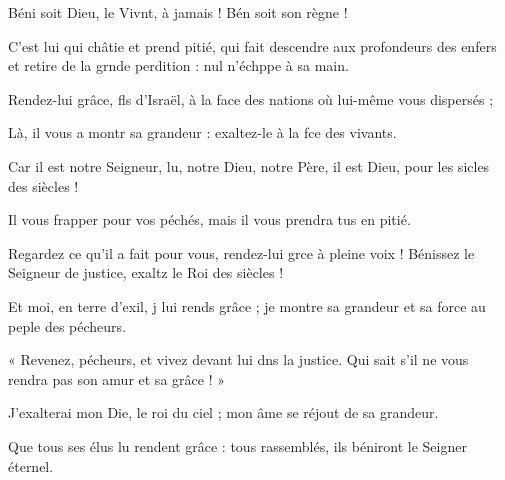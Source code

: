 \item Béni soit Dieu, le Vivnt, à jamais !\psstar{} Bén soit son règne !
\item C’est lui qui châtie et prend pitié,\pscross{} qui fait descendre aux profondeurs des enfers et retire de la grnde perdition :\psstar{} nul n’échppe à sa main.
\item Rendez-lui grâce, fls d’Israël,\psstar{} à la face des nations où lui-même vous  dispersés ;
\item Là, il vous a montr sa grandeur :\psstar{} exaltez-le à la fce des vivants. 
\item Car il est notre Seigneur, lu, notre Dieu,\psstar{} notre Père, il est Dieu, pour les sicles des siècles !
\item Il vous frapper pour vos péchés,\psstar{} mais il vous prendra tus en pitié.
\item Regardez ce qu’il a fait pour vous, rendez-lui grce à pleine voix !\psstar{} Bénissez le Seigneur de justice, exaltz le Roi des siècles !
\item Et moi, en terre d’exil, j lui rends grâce ;\psstar{} je montre sa grandeur et sa force au peple des pécheurs. 
\item « Revenez, pécheurs, et vivez devant lui dns la justice.\psstar{} Qui sait s’il ne vous rendra pas son amur et sa grâce ! »
\item J'exalterai mon Die, le roi du ciel ;\psstar{} mon âme se réjout de sa grandeur.
\item Que tous ses élus lu rendent grâce :\psstar{} tous rassemblés, ils béniront le Seigner éternel.